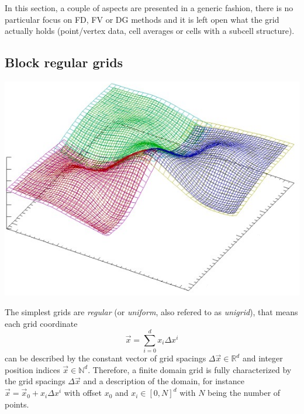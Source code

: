 In this section, a couple of aspects are presented in a generic fashion, \ie there
is no particular focus on FD, FV or DG methods and it is left open what the grid
actually holds (point/vertex data, cell averages or cells with a subcell structure).

\subsection{Block regular grids}\label{sec:block-regular-grids}
\begin{marginfigure}
	\includegraphics[width=\linewidth]{numerics-grids/cactus-components.png}
	\caption[
	  Sketch of Carpet grid covering, ]%
	{A height-elevated plot of a scalar field on a two-dimensional domain. The displayed
	 grid structure reveals a unigrid layout. Multiple patches are shown which cover the
	 physical domain, each having the same resolution $\Delta \vec x$. Color is used
	 to distinguish the patches. Furthermore, the overlapping ghost zones are displayed
	 in a different colour. Figure modified from~\cite{carpet_web}.}%
	\label{fig:numerics-cactus-components}
\end{marginfigure}
%
The simplest grids are \emph{regular} (or \emph{uniform}, also refered to as \emph{unigrid}),
that means each grid coordinate
\begin{equation}
\vec x = \sum_{i=0}^d x_i \Delta x^i
\end{equation}
can be described by the constant vector of grid spacings $\Delta \vec x \in \mathbb{R}^d$ and
integer position indices $\vec x \in \mathbb{N}^d$. Therefore, a finite domain grid is fully
characterized
by the grid spacings $\Delta \vec x$ and a description of the domain, for instance
$\vec x = \vec x_0 + x_i \Delta x^i$ with offset $x_0$ and $x_i \in [0,N]^d$ with $N$
being the number of points.

